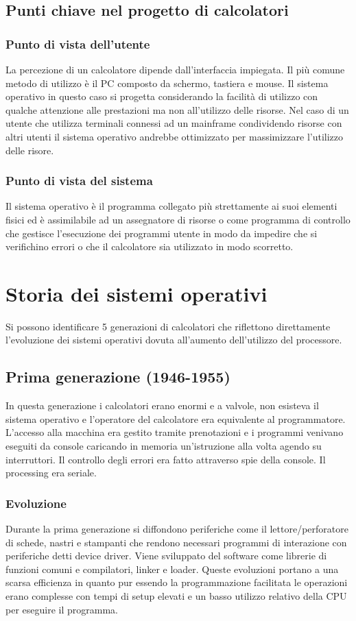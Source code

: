 \subsection{Punti chiave nel progetto di calcolatori}
\subsubsection{Punto di vista dell'utente}
La percezione di un calcolatore dipende dall'interfaccia impiegata. Il pi\`u comune metodo di utilizzo \`e il PC composto da schermo, tastiera e mouse. Il sistema operativo in questo caso si progetta considerando la facilit\`a di
utilizzo con qualche attenzione alle prestazioni ma non all'utilizzo delle risorse. Nel caso di un utente che utilizza terminali connessi ad un mainframe condividendo risorse con altri utenti il sistema operativo andrebbe ottimizzato
per massimizzare l'utilizzo delle risore.
\subsubsection{Punto di vista del sistema}
Il sistema operativo \`e il programma collegato pi\`u strettamente ai suoi elementi fisici ed \`e assimilabile ad un assegnatore di risorse o come programma di controllo che gestisce l'esecuzione dei programmi utente in modo da
impedire che si verifichino errori o che il calcolatore sia utilizzato in modo scorretto.
\section{Storia dei sistemi operativi}
Si possono identificare 5 generazioni di calcolatori che riflettono direttamente l'evoluzione dei sistemi operativi dovuta all'aumento dell'utilizzo del processore.
\subsection{Prima generazione (1946-1955)}
In questa generazione i calcolatori erano enormi e a valvole, non esisteva il sistema operativo e l'operatore del calcolatore era equivalente al programmatore. L'accesso alla macchina era gestito tramite
prenotazioni e i programmi venivano eseguiti da console caricando in memoria un'istruzione alla volta agendo su interruttori. Il controllo degli errori era fatto attraverso spie della console. Il processing era
seriale.
\subsubsection{Evoluzione}
Durante la prima generazione si diffondono periferiche come il lettore/perforatore di schede, nastri e stampanti che rendono necessari programmi di interazione con periferiche detti device driver. Viene
sviluppato del software come librerie di funzioni comuni e compilatori, linker e loader. Queste evoluzioni portano a una scarsa efficienza in quanto pur essendo la programmazione facilitata le operazioni erano
complesse con tempi di setup elevati e un basso utilizzo relativo della CPU per eseguire il programma.
